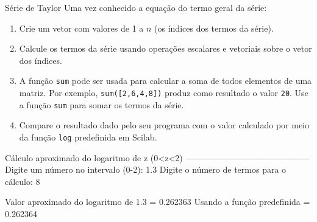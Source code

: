 \documentclass[11pt,fleqn]{practice}
\begin{document}
\begin{task}[breakable]{Série de Taylor}{}
  Uma vez conhecido a equação do termo geral da série:
  \begin{enumerate}
    \item Crie um vetor com valores de 1 a $n$ (os índices dos termos da
    série).
    \item Calcule os termos da série usando operações escalares e
    vetoriais sobre o vetor dos índices.
    \item A função \texttt{sum} pode ser usada para calcular a soma de
    todos elementos de uma matriz. Por exemplo, \texttt{sum([2,6,4,8])}
    produz como resultado o valor \texttt{20}. Use a função \texttt{sum}
    para somar os termos da série.
    \item Compare o resultado dado pelo seu programa com o valor
    calculado por meio da função \texttt{log} predefinida em Scilab.
  \end{enumerate}

  \begin{runexample}
Cálculo aproximado do logaritmo de z (0<z<2) 
--------------------------------------------
Digite um número no intervalo (0-2): 1.3
Digite o número de termos para o cálculo: 8

Valor aproximado do logaritmo de 1.3 = 0.262363
Usando a função predefinida = 0.262364
  \end{runexample}

  \tcblower
  \solution
\end{task}
\end{document}
